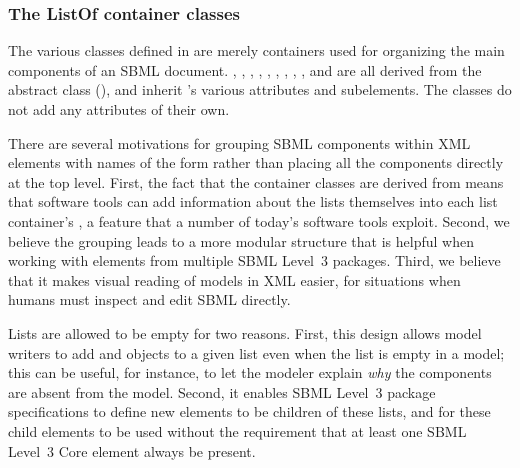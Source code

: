 \subsubsection{The ListOf container classes}
\label{sec:listof}
\label{sec:listofunitdefinitions}
\label{sec:listoffunctiondefinitions}
\label{sec:listofcompartments}
\label{sec:listofspecies}
\label{sec:listofparameters}
\label{sec:listofinitialassignments}
\label{sec:listofinitialassign}
\label{sec:listofrules}
\label{sec:listofconstraints}
\label{sec:listofreactions}
\label{sec:listofevents}

The various \ListOf classes defined in  are
merely containers used for organizing the main components of an
SBML document.  \ListOfFunctionDefinitions,
\ListOfUnitDefinitions, \ListOfCompartments, \ListOfSpecies,
\ListOfParameters, \ListOfInitialAssignments, \ListOfRules,
\ListOfConstraints, \ListOfReactions, and \ListOfEvents are all
derived from the abstract class \SBase (),
and inherit \SBase's various attributes and subelements.  The
\ListOf classes do not add any attributes of their own.

There are several motivations for grouping SBML components within
XML elements with names of the form 
rather than placing all the components directly at the top level.
First, the fact that the container classes are derived from \SBase
means that software tools can add information about the lists
themselves into each list container's \Annotation, a feature that
a number of today's software tools exploit.  Second, we believe
the grouping leads to a more modular structure that is helpful
when working with elements from multiple SBML Level~3 packages.
Third, we believe that it makes visual reading of models in XML
easier, for situations when humans must inspect and edit SBML
directly.

\begin{blockChanged}
Lists are allowed to be empty for two reasons.  First, this design allows model writers to add \Annotation and \Notes objects to a given list even when the list is empty in a model; this can be useful, for instance, to let the modeler explain \emph{why} the components are absent from the model.  Second, it enables SBML Level~3 package specifications to define new elements to be children of these lists, and for these child elements to be used without the requirement that at least one SBML Level~3 Core element always be present.
\end{blockChanged}

